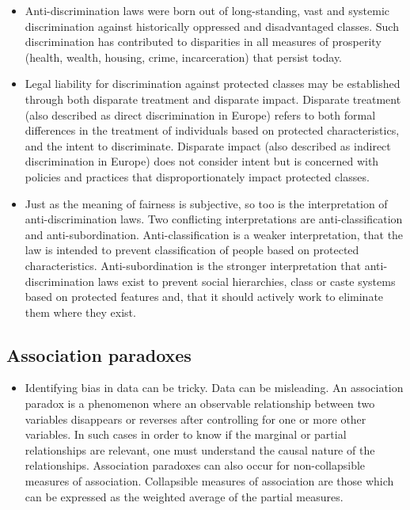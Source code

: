 \begin{itemize}[leftmargin=*]
%
\item Anti-discrimination laws were born out of long-standing, vast and systemic discrimination against historically oppressed and disadvantaged classes. Such discrimination has contributed to disparities in all measures of prosperity (health, wealth, housing, crime, incarceration) that persist today.
%
\item Legal liability for discrimination against protected classes may be established through both disparate treatment and disparate impact. Disparate treatment (also described as direct discrimination in Europe) refers to both formal differences in the treatment of individuals based on protected characteristics, and the intent to discriminate. Disparate impact (also described as indirect discrimination in Europe) does not consider intent but is concerned with policies and practices that disproportionately impact protected classes.
%
\item Just as the meaning of fairness is subjective, so too is the interpretation of anti-discrimination laws. Two conflicting interpretations are anti-classification and anti-subordination. Anti-classification is a weaker interpretation, that the law is intended to prevent classification of people based on protected characteristics. Anti-subordination is the stronger interpretation that anti-discrimination laws exist to prevent social hierarchies, class or caste systems based on protected features and, that it should actively work to eliminate them where they exist.
\end{itemize}

\subsection*{Association paradoxes}

\begin{itemize}[leftmargin=*]
\item Identifying bias in data can be tricky. Data can be misleading. An association paradox is a phenomenon where an observable relationship between two variables disappears or reverses after controlling for one or more other variables. In such cases in order to know if the marginal or partial relationships are relevant, one must understand the causal nature of the relationships. Association paradoxes can also occur for non-collapsible measures of association. Collapsible measures of association are those which can be expressed as the weighted average of the partial measures.
\end{itemize}

